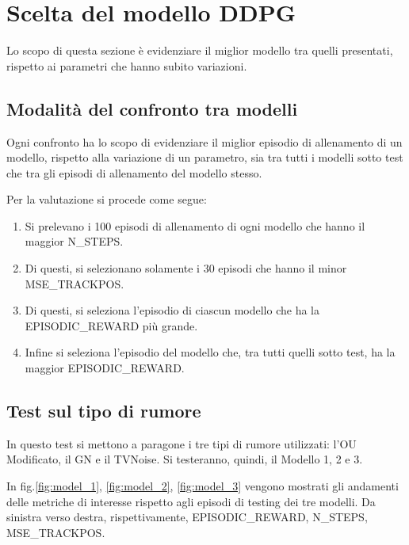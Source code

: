 \clearpage



\section{Scelta del modello DDPG}

Lo scopo di questa sezione è evidenziare il miglior modello tra quelli presentati, rispetto ai parametri che hanno subito variazioni. 

\subsection{Modalità del confronto tra modelli}\label{confronto_modelli}

Ogni confronto ha lo scopo di evidenziare il miglior episodio di allenamento di un modello, rispetto alla variazione di un parametro, sia tra tutti i modelli sotto test che tra gli episodi di allenamento del modello stesso.
\newline

Per la valutazione si procede come segue:
\begin{enumerate}
    \item Si prelevano i 100 episodi di allenamento di ogni modello che hanno il maggior N\_STEPS.
    \item Di questi, si selezionano solamente i 30 episodi che hanno il minor MSE\_TRACKPOS.
    \item Di questi, si seleziona l'episodio di ciascun modello che ha la EPISODIC\_REWARD più grande.
    \item Infine si seleziona l'episodio del modello che, tra tutti quelli sotto test, ha la maggior EPISODIC\_REWARD.
\end{enumerate}

\clearpage

\subsection{Test sul tipo di rumore}

In questo test si mettono a paragone i tre tipi di rumore utilizzati: l'OU Modificato, il GN e il TVNoise. Si testeranno, quindi, il Modello 1, 2 e 3.
\newline

In fig.\ref{fig:model_1}, \ref{fig:model_2}, \ref{fig:model_3} vengono mostrati gli andamenti delle metriche di interesse rispetto agli episodi di testing dei tre modelli. Da sinistra verso destra, rispettivamente, EPISODIC\_REWARD, N\_STEPS, MSE\_TRACKPOS.


